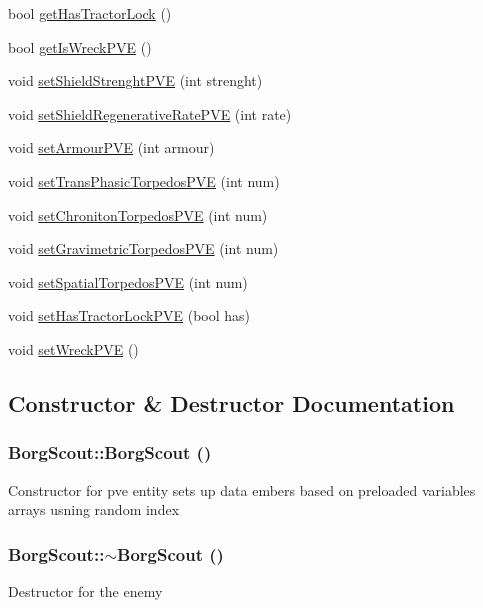 \begin{DoxyCompactItemize}
\item 
bool \hyperlink{classBorgScout_ac6bc77f2e7232631646afb05b9f706ea}{getHasTractorLock} ()
\item 
bool \hyperlink{classBorgScout_ad904fc2d7473517dc3e9f9a896b1b870}{getIsWreckPVE} ()
\item 
void \hyperlink{classBorgScout_a281c1d904ce2a40d6441b43cafb207c9}{setShieldStrenghtPVE} (int strenght)
\item 
void \hyperlink{classBorgScout_a500ce15b9d01c79a8f7ebefe060b0d6a}{setShieldRegenerativeRatePVE} (int rate)
\item 
void \hyperlink{classBorgScout_ab4cfe88166b8473ec3901afc1f05b462}{setArmourPVE} (int armour)
\item 
void \hyperlink{classBorgScout_aee2837e76125a16bdd56ff967902e99f}{setTransPhasicTorpedosPVE} (int num)
\item 
void \hyperlink{classBorgScout_a82eb31f8b1d94b9ea57cadb97bd276f3}{setChronitonTorpedosPVE} (int num)
\item 
void \hyperlink{classBorgScout_aeb73af88f67173bff2f37138ef8b4b59}{setGravimetricTorpedosPVE} (int num)
\item 
void \hyperlink{classBorgScout_ac911250166eb1fa47f602ead65f7b834}{setSpatialTorpedosPVE} (int num)
\item 
void \hyperlink{classBorgScout_a1d6f8704e2832ef1878d00a2cff6b288}{setHasTractorLockPVE} (bool has)
\item 
void \hyperlink{classBorgScout_ad387c5b9ea86f8e53f6f5ab4cf83bb42}{setWreckPVE} ()
\end{DoxyCompactItemize}


\subsection{Constructor \& Destructor Documentation}
\hypertarget{classBorgScout_a4867f3f56ad3f67850e66d89682318a1}{
\subsubsection[{BorgScout}]{\setlength{\rightskip}{0pt plus 5cm}BorgScout::BorgScout ()}}
\label{d5/d8c/classBorgScout_a4867f3f56ad3f67850e66d89682318a1}
Constructor for pve entity sets up data embers based on preloaded variables arrays usning random index \hypertarget{classBorgScout_a40f473098c9948cc5bc8df98c1ad58d8}{
\subsubsection[{$\sim$BorgScout}]{\setlength{\rightskip}{0pt plus 5cm}BorgScout::$\sim$BorgScout ()}}
\label{d5/d8c/classBorgScout_a40f473098c9948cc5bc8df98c1ad58d8}
Destructor for the enemy 

